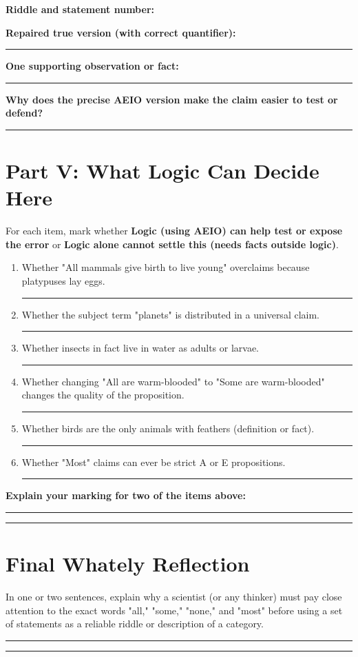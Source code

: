 \documentclass[12pt]{article}
\newcommand{\studentline}{\par\vspace{0.60em}\hrule\vspace{0.64em}}
\begin{document}
\textbf{Riddle and statement number:}\hrulefill

\textbf{Repaired true version (with correct quantifier):}\studentline

\textbf{One supporting observation or fact:}\studentline

\textbf{Why does the precise AEIO version make the claim easier to test or defend?}\studentline

\Needspace{0.30\textheight}

\section*{Part V: What Logic Can Decide Here}

For each item, mark whether \textbf{Logic (using AEIO) can help test or expose the error} or \textbf{Logic alone cannot settle this (needs facts outside logic)}.

\begin{enumerate}[leftmargin=*]
\item Whether "All mammals give birth to live young" overclaims because platypuses lay eggs. \hfill \rule{1.6in}{0.4pt}
\item Whether the subject term "planets" is distributed in a universal claim. \hfill \rule{1.6in}{0.4pt}
\item Whether insects in fact live in water as adults or larvae. \hfill \rule{1.6in}{0.4pt}
\item Whether changing "All are warm-blooded" to "Some are warm-blooded" changes the quality of the proposition. \hfill \rule{1.6in}{0.4pt}
\item Whether birds are the only animals with feathers (definition or fact). \hfill \rule{1.6in}{0.4pt}
\item Whether "Most" claims can ever be strict A or E propositions. \hfill \rule{1.6in}{0.4pt}
\end{enumerate}

\textbf{Explain your marking for two of the items above:}\studentline\studentline

\Needspace{0.30\textheight}

\section*{Final Whately Reflection}

In one or two sentences, explain why a scientist (or any thinker) must pay close attention to the exact words "all," "some," "none," and "most" before using a set of statements as a reliable riddle or description of a category.

\studentline\studentline
\end{document}
